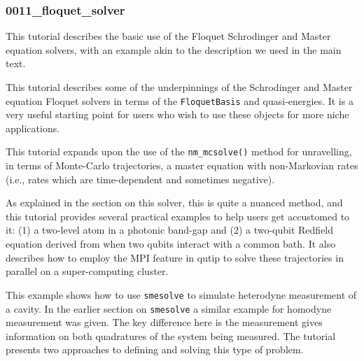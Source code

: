 \documentclass[preprint,3p,sort&compress]{elsarticle}
\def\code#1{\texttt{#1}}
\newcommand{\nocontentsline}[3]{}
\newcommand{\tocless}[2]{\bgroup\let\addcontentsline=\nocontentsline#1{#2}\egroup}
\begin{document}
\tocless\subsubsection{0011\_floquet\_solver}

This tutorial describes the basic use of the Floquet Schrodinger and Master equation solvers, with an example akin to the description we used in the main text. \newline

\tocless\subsubsection{0012\_floquet\_formalism}

This tutorial describes some of the underpinnings of the Schrodinger and Master equation Floquet solvers in terms of the \code{FloquetBasis} and quasi-energies.  It is a very useful starting point for users who wish to use these objects for more niche applications.\newline

\tocless\subsubsection{0013\_nonmarkovian\_monte\_carlo}

This tutorial expands upon the use of the \code{nm\_mcsolve()} method for unravelling, in terms of Monte-Carlo trajectories, a master equation with non-Markovian rates (i.e., rates which are time-dependent and sometimes negative). 

As explained in the section on this solver, this is quite a nuanced method, and this tutorial provides several practical examples to help users get accustomed to it: (1) a  two-level atom in a photonic band-gap and (2) a two-qubit Redfield equation derived from when two qubits interact with a common bath.  It also describes how to employ the MPI feature in qutip to solve these trajectories in parallel on a super-computing cluster.\newline


\tocless\subsubsection{0015\_smesolve-heterodyne}

This example shows how to use \code{smesolve} to simulate heterodyne measurement of a cavity. In the earlier section on \code{smesolve} a similar example for homodyne measurement was given.  The key difference here is the measurement gives information on both quadratures of the system being measured.  The tutorial presents two approaches to defining and solving this type of problem.\newline
\end{document}
